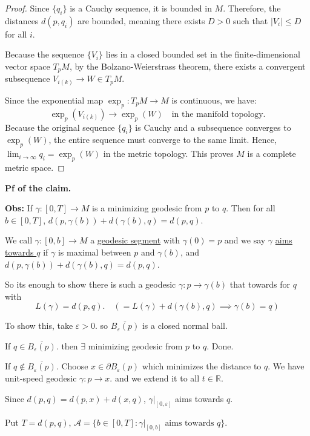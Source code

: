 \documentclass[11pt, a4paper]{article}
\theoremstyle{plain}
\theoremstyle{definition}
\theoremstyle{remark}
\begin{document}
{\begin{proof}
Since $\{q_i\}$ is a Cauchy sequence, it is bounded in $M$. Therefore, the distances $d(p, q_i)$ are bounded, meaning there exists $D > 0$ such that $|V_i| \le D$ for all $i$.

Because the sequence $\{V_i\}$ lies in a closed bounded set in the finite-dimensional vector space $T_pM$, by the Bolzano-Weierstrass theorem, there exists a convergent subsequence $V_{i(k)} \to W \in T_pM$.

Since the exponential map $\exp_p: T_pM \to M$ is continuous, we have:
\[ \exp_p(V_{i(k)}) \to \exp_p(W) \quad \text{in the manifold topology.} \]
Because the original sequence $\{q_i\}$ is Cauchy and a subsequence converges to $\exp_p(W)$, the entire sequence must converge to the same limit. Hence, $\lim_{i \to \infty} q_i = \exp_p(W)$ in the metric topology. This proves $M$ is a complete metric space.
\end{proof}

\noindent \textbf{Pf of the claim.}

\noindent \textbf{Obs:} If $\gamma : [0, T] \to M$ is a minimizing geodesic from $p$ to $q$. Then for all $b \in[0, T]$, $d(p, \gamma(b)) + d(\gamma(b), q) = d(p, q)$.

\noindent We call $\gamma : [0, b] \to M$ a \underline{geodesic segment} with $\gamma(0) = p$ and we say $\gamma$ \underline{aims towards $q$} if $\gamma$ is maximal between $p$ and $\gamma(b)$, and $d(p, \gamma(b)) + d(\gamma(b), q) = d(p, q)$.

\noindent So its enough to show there is such a geodesic $\gamma : p \to \gamma(b)$ that towards for $q$ with 
\[ L(\gamma) = d(p, q). \quad (= L(\gamma) + d(\gamma(b), q) \implies \gamma(b) = q) \]

\noindent To show this, take $\varepsilon > 0$. so $\overline{B_\varepsilon(p)}$ is a closed normal ball.

\noindent If $q \in \overline{B_\varepsilon(p)}$. then $\exists$ minimizing geodesic from $p$ to $q$. Done.

\noindent If $q \notin \overline{B_\varepsilon(p)}$. Choose $x \in \partial B_\varepsilon(p)$ which minimizes the distance to $q$. We have unit-speed geodesic $\gamma : p \to x$. and we extend it to all $t \in \mathbb{R}$.

\noindent Since $d(p, q) = d(p, x) + d(x, q)$, $\gamma|_{[0, \varepsilon]}$ aims towards $q$.

\noindent Put $T = d(p, q)$, $\mathcal{A} = \{ b \in [0, T] : \gamma|_{[0, b]} \text{ aims towards } q \}$.

}
\end{document}
